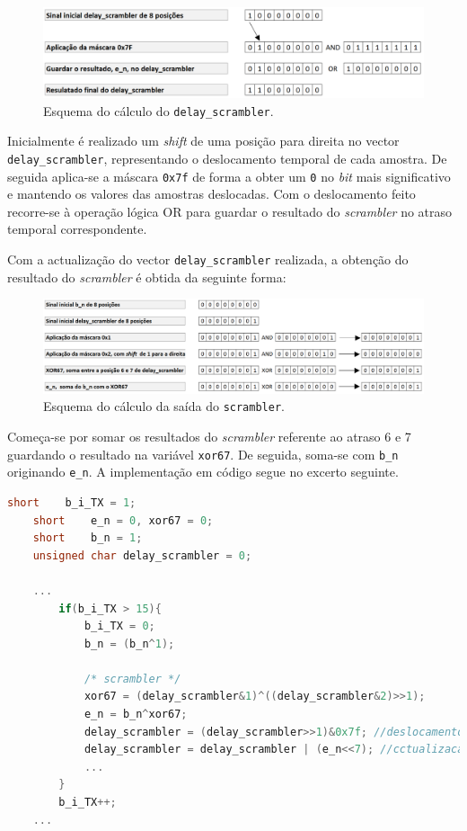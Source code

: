 \documentclass[11pt]{article}
\numberwithin{equation}{section}
\begin{document}
\begin{figure}[H]
	\centering
	\includegraphics[keepaspectratio=true, scale=0.40]{teoricas/calculodoscrambler}
	\caption{Esquema do cálculo do \texttt{delay\_scrambler}.}
	\vspace{-0.8em}
\end{figure}

Inicialmente é realizado um \textit{shift} de uma posição para direita no vector \texttt{delay\_scrambler}, representando o deslocamento temporal de cada amostra. De seguida aplica-se a máscara \texttt{0x7f} de forma a obter um \texttt{0} no \textit{bit} mais significativo e mantendo os valores das amostras deslocadas. Com o deslocamento feito recorre-se à operação lógica OR para guardar o resultado do \textit{scrambler} no atraso temporal correspondente.

Com a actualização do vector \texttt{delay\_scrambler} realizada, a obtenção do resultado do \textit{scrambler} é obtida da seguinte forma:  

\begin{figure}[H]
	\centering
	\includegraphics[keepaspectratio=true, scale=0.40]{teoricas/calculodeen}
	\caption{Esquema do cálculo da saída do \texttt{scrambler}.}
	\vspace{-0.8em}
\end{figure}

Começa-se por somar os resultados do \textit{scrambler} referente ao atraso 6 e 7 guardando o resultado na variável \texttt{xor67}. De seguida, soma-se com \texttt{b\_n} originando \texttt{e\_n}. A implementação em código segue no excerto seguinte.

\begin{lstlisting}[language=C]
	short    b_i_TX = 1;
	short    e_n = 0, xor67 = 0;
	short    b_n = 1;
	unsigned char delay_scrambler = 0;
	
	...
		if(b_i_TX > 15){
			b_i_TX = 0;
			b_n = (b_n^1);
			 
			/* scrambler */
			xor67 = (delay_scrambler&1)^((delay_scrambler&2)>>1);
			e_n = b_n^xor67;
			delay_scrambler = (delay_scrambler>>1)&0x7f; //deslocamento temporal
			delay_scrambler = delay_scrambler | (e_n<<7); //cctualizacao do novo valor de e_n no vector
			...
		}
		b_i_TX++;	
	...
\end{lstlisting}
\end{document}
